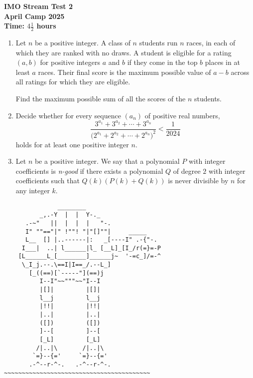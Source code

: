 \documentclass[12pt]{article}
\begin{document}
\thispagestyle{empty}

\begin{center}
  \textbf{\Large IMO Stream Test 2}
  \\ \vspace{1em}
  \textbf{\large April Camp 2025}
  \\ \vspace{1em}
  \textbf{\large Time: $4\frac{1}{2}$ hours}
\end{center}


\begin{enumerate}[leftmargin=0pt,topsep=2\bigskipamount,itemsep=\medskipamount]

\item Let $n$ be a positive integer. A class of $n$ students run $n$ races, in each of which they are ranked with no draws. A student is eligible for a rating $(a, b)$ for positive integers $a$ and $b$ if they come in the top $b$ places in at least $a$ races. Their final score is the maximum possible value of $a-b$ across all ratings for which they are eligible.

\vspace{0.2cm}
Find the maximum possible sum of all the scores of the $n$ students.


\item Decide whether for every sequence $(a_n)$ of positive real numbers,
\[
\frac{3^{a_1} + 3^{a_2} +\cdots+3^{a_n}}{({2^{a_1} + 2^{a_2} +\cdots+2^{a_n})}^2}<\frac{1}{2024}
\]
holds for at least one positive integer $n$.

\item Let $n$ be a positive integer. We say that a polynomial $P$ with integer coefficients is \textit{n-good} if there exists a polynomial $Q$ of degree $2$ with integer coefficients such that $Q(k)(P(k)+Q(k))$ is never divisible by $n$ for any integer $k$.

\end{enumerate}


\vfill
\centering
\tiny %
\begin{BVerbatim}
               ________
          _,.-Y  |  |  Y-._
      .-~"   ||  |  |  |   "-.
      I" ""=="|" !""! "|"[]""|     _____
      L__  [] |..------|:   _[----I" .-{"-.
     I___|  ..| l______|l_ [__L]_[I_/r(=}=-P
    [L______L_[________]______j~  '-=c_]/=-^
     \_I_j.--.\==I|I==_/.--L_]
       [_((==)[`-----"](==)j
          I--I"~~"""~~"I--I
          |[]|         |[]|
          l__j         l__j
          |!!|         |!!|
          |..|         |..|
          ([])         ([])
          ]--[         ]--[
          [_L]         [_L]
         /|..|\       /|..|\
        `=}--{='     `=}--{='
       .-^--r-^-.   .-^--r-^-.
~~~~~~~~~~~~~~~~~~~~~~~~~~~~~~~~~~~~~~~~~
\end{BVerbatim}
\end{document}
